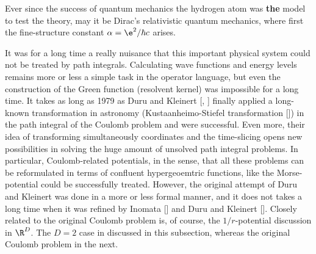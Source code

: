 Ever since the success of quantum mechanics the hydrogen atom was {\bf
the} model to test the theory, may it be Dirac's relativistic quantum
mechanics, where first the fine-structure
constant $\alpha=\e^2/\hbar c$ arises.

It was for a long time a really nuisance that this important
physical system could not be treated by path integrals. Calculating
wave functions and energy levels remains more or less a simple task in
the operator language, but even the construction of the Green function
(resolvent kernel) was impossible for a long time. It takes as long as
1979 as Duru and Kleinert [\DKa, \DKb] finally applied a long-known
transformation in astronomy (Kustaanheimo-Stiefel transformation
[\KUST]) in the path integral of the Coulomb problem and were
successful. Even more, their idea of transforming simultaneously
coordinates and the time-slicing opens new possibilities in solving the
huge amount of unsolved path integral problems. In particular,
Coulomb-related potentials, in the sense, that all these problems can
be reformulated in terms of confluent hypergeoemtric functions, like
the Morse-potential could be successfully treated. However, the
original attempt of Duru and Kleinert was done in a more or less formal
manner, and it does not takes a long time when it was refined by
Inomata [\INOb] and Duru and Kleinert [\DKb].
\newline
Closely related to the original Coulomb problem is, of course,
the $1/r$-potential discussion in $\R^D$. The $D=2$ case in discussed
in this subsection, whereas the original Coulomb problem in the next.

